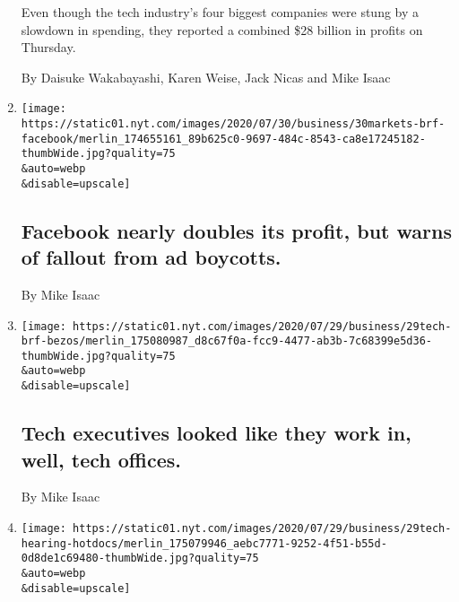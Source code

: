 \begin{enumerate}
  Even though the tech industry's four biggest companies were stung by a
  slowdown in spending, they reported a combined \$28 billion in profits
  on Thursday.

  By Daisuke Wakabayashi, Karen Weise, Jack Nicas and Mike Isaac
\item
  \href{/live/2020/07/30/business/stock-market-today-coronavirus/facebook-nearly-doubles-its-profit-but-warns-of-fallout-from-ad-boycotts}{}

  \texttt{[image: https://static01.nyt.com/images/2020/07/30/business/30markets-brf-facebook/merlin\_174655161\_89b625c0-9697-484c-8543-ca8e17245182-thumbWide.jpg?quality=75\\\&auto=webp\\\&disable=upscale]}

  \hypertarget{facebook-nearly-doubles-its-profit-but-warns-of-fallout-from-ad-boycotts}{%
  \subsection{Facebook nearly doubles its profit, but warns of fallout
  from ad
  boycotts.}\label{facebook-nearly-doubles-its-profit-but-warns-of-fallout-from-ad-boycotts}}

  By Mike Isaac
\item
  \href{/live/2020/07/29/technology/tech-ceos-hearing-testimony/tech-executives-looked-like-they-work-in-well-tech-offices}{}

  \texttt{[image: https://static01.nyt.com/images/2020/07/29/business/29tech-brf-bezos/merlin\_175080987\_d8c67f0a-fcc9-4477-ab3b-7c68399e5d36-thumbWide.jpg?quality=75\\\&auto=webp\\\&disable=upscale]}

  \hypertarget{tech-executives-looked-like-they-work-in-well-tech-offices}{%
  \subsection{Tech executives looked like they work in, well, tech
  offices.}\label{tech-executives-looked-like-they-work-in-well-tech-offices}}

  By Mike Isaac
\item
  \href{/live/2020/07/29/technology/tech-ceos-hearing-testimony/lawmakers-said-documents-show-facebook-tried-to-neutralize-a-competitive-threat}{}

  \texttt{[image: https://static01.nyt.com/images/2020/07/29/business/29tech-hearing-hotdocs/merlin\_175079946\_aebc7771-9252-4f51-b55d-0d8de1c69480-thumbWide.jpg?quality=75\\\&auto=webp\\\&disable=upscale]}

  \hypertarget{lawmakers-said-documents-show-facebook-tried-to-neutralize-a-competitive-threat}{%
}
\end{enumerate}
